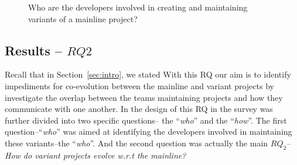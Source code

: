 \begin{figure}[ht]
\centering
\vspace{-.3cm}
    \hfill
    \hfill
    \hfill
    \caption{Who are the developers involved in creating and maintaining variants of a mainline project?}
     \label{fig:original_common}
     \vspace{-.3cm}
\end{figure}


\subsection{Results -- $RQ2$}
Recall that in Section~\ref{sec:intro}, we stated \textbf{\rqTwo}
With this RQ our aim is to identify impediments for co-evolution between the mainline and variant projects by investigate the overlap between the teams maintaining projects and how they communicate with one another.
In the design of this RQ in the survey was further divided into two specific questions-- the ``\textit{who}'' and the ``\textit{how}''. The first question--``\textit{who}'' was aimed at identifying the developers involved in maintaining these variants--the ``\textit{who}''. And the second question was actually the main $RQ_2$--\textit{How do  variant  projects  evolve  w.r.t  the  mainline?}

